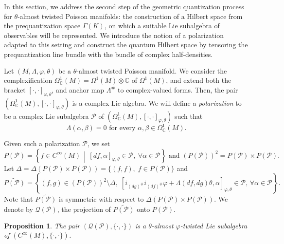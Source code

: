 \documentclass[a4paper,10pt]{article}
\numberwithin{equation}{section}
\theoremstyle{plain}
\newtheorem{proposition}[theorem]{Proposition}
\begin{document}
	
In this section, we address the second step of the geometric quantization process for $\theta$-almost twisted Poisson manifolds: the construction of a Hilbert space from the prequantization space $\Gamma(K)$, on which a suitable Lie subalgebra of observables will be represented. We introduce the notion of a polarization adapted to this setting and construct the quantum Hilbert space by tensoring the prequantization line bundle with the bundle of complex half-densities.
	
	
	Let $(M,\Lambda,\varphi,\theta)$ be a $\theta$-almost twisted Poisson manifold. We  consider the complexification $\Omega_{\mathbb{C}}^1(M)=\Omega^1(M)\otimes \mathbb{C}$ of $\Omega^1(M)$, and extend both the bracket $[\cdot,\cdot]_{\varphi,\theta}$, and anchor map $\Lambda^\#$ to complex-valued forms. Then, the  pair $(\Omega_{\mathbb{C}}^1(M),[\cdot,\cdot]_{\varphi,\theta})$ is a complex Lie algebra.  We will define a \emph{polarization} to be a complex Lie subalgebra $\mathcal{P}$ of   $(\Omega_{\mathbb{C}}^1(M),[\cdot,\cdot]_{\varphi,\theta})$ such that
	$$\Lambda(\alpha,\beta)=0\text{ for every }\alpha,\beta\in\Omega_{\mathbb{C}}^1(M).$$
	
	Given such  a polarization $\mathcal{P}$, we  set
	\[
	P(\mathcal{P}) = \left\{ f \in C^\infty(M) \,\middle|\, [df,\alpha]_{\varphi,\theta} \in \mathcal{P},\ \forall \alpha \in \mathcal{P} \right\} \text{ and } \left(P(\mathcal{P})\right)^2=P(\mathcal{P}) \times P(\mathcal{P}).
	\]
	Let $\Delta=\Delta(P(\mathcal{P}) \times P(\mathcal{P}))=\{(f,f),\; f\in P(\mathcal{P})\}$ and
	\[
	\widetilde{P(\mathcal{P})} = \left\{ (f,g) \in \left(P(\mathcal{P})\right)^2 \setminus \Delta,\; [i_{(dg)^\#}i_{(df)^\#}\varphi+\Lambda(df,dg)\theta, \alpha]_{\varphi,\theta} \in \mathcal{P},\, \forall \alpha \in \mathcal{P} \right\}.
	\]
	Note that $\widetilde{P(\mathcal{P})}$  is symmetric with respect to  $\Delta(P(\mathcal{P}) \times P(\mathcal{P}))$.  We denote by  $\mathcal{Q}(\mathcal{P})$, the projection  of $\widetilde{P(\mathcal{P})}$ onto  $P(\mathcal{P})$.
	
	
	\begin{proposition} The pair
		$(\mathcal{Q}(\mathcal{P}),\{\cdot,\cdot\})$ is a $\theta$-almost $\varphi$-twisted Lie  subalgebra of $(C^\infty(M),\{\cdot,\cdot\})$.
	\end{proposition}
	
\end{document}
